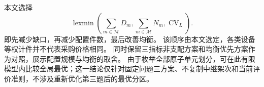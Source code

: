 本文选择
\begin{equation}
  \operatorname{lexmin}\left(
     \sum_{m\in\mathcal M}D_m,
     \sum_{m\in\mathcal M}N_m,
     \operatorname{CV}_L\right).
  \label{eq:q4:objective}
\end{equation}
即先减少缺口，再减少配置件数，最后改善均衡。
该顺序由本文选定，各类设备等权计件并不代表采购价格相同。
同时保留三指标非支配方案和均衡优先方案作为对照，展示配置规模与均衡的取舍。
由于枚举全部原子单元划分，可在此有限模型内比较全局最优；这一结论仅针对固定问题三方案、不复制中继架次和当前评价准则，不涉及重新优化第三题后的最优分区。
